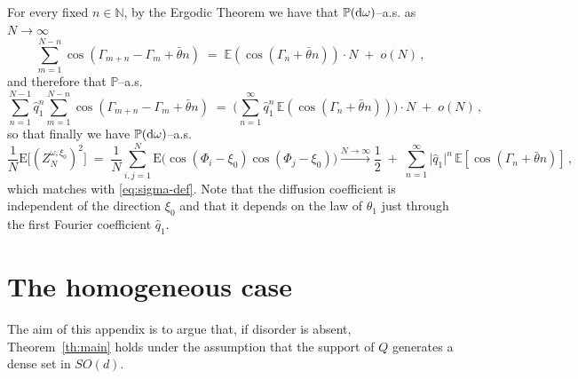 \documentclass[a4paper,reqno,11pt]{amsart}
\numberwithin{equation}{section}
\newcommand{\bbE}{{\ensuremath{\mathbb E}} }
\newcommand{\bbP}{{\ensuremath{\mathbb P}} }
\newcommand{\go}{\omega}
\newcommand{\dd}{\text{\rm d}}             %
\newcommand{\N}{\mathbb{N}}
\def\bE{\ensuremath{\bs{\mathrm{E}}}}
\def\bs{\boldsymbol}
\begin{document}
For every fixed $n\in\N$, by the Ergodic Theorem we have that $\bbP(\dd \go)$--a.s. as $N\to\infty$
\begin{equation}
    \sum_{m=1}^{N-n} \cos(\Gamma_{m+n} - \Gamma_m+\bar \theta n) \;=\; \bbE(\cos(\Gamma_n+\bar \theta n))
    \cdot N \;+\; o(N) \,,
\end{equation}
and therefore that $\bbP$--a.s.
\begin{equation}
    \sum_{n=1}^{N-1} \hat q_1^n \sum_{m=1}^{N-n} \cos(\Gamma_{m+n}
    - \Gamma_m + \bar \theta n) \;=\;
    \Bigg( \sum_{n=1}^\infty \hat q_1^n \,\bbE\left(\cos(\Gamma_n+\bar \theta n)\right) \Bigg) \cdot N \;+\; o(N)\,,
\end{equation}
so that finally we have $\bbP(\dd \go)$--a.s.
\begin{equation}
\label{eq:diffusion}
    \frac 1 N \bE\big[ (Z^{\go,\xi_0}_N)^2 \big]  \;=\;
    \frac{1}{N}\sum_{i,j = 1}^N \bE \big( \cos(\Phi_i-\xi_0)
    \cos(\Phi_j-\xi_0) \big) \stackrel{ N\to\infty }\longrightarrow
    \frac 12 \;+\; \sum_{n=1}^\infty \vert \hat q_1\vert^n \,\bbE[\cos(\Gamma_n +\bar \theta n)]\,,
\end{equation}
which matches with \eqref{eq:sigma-def}.
Note that the diffusion coefficient is independent of the direction
$\xi_0$ and that it depends on the law of
$\theta_1$ just through the first Fourier coefficient $\hat q_1$.


\medskip

\section{The homogeneous case}
\label{app:hom}

The aim of this appendix is to argue that, if disorder
is absent, Theorem~\ref{th:main} holds under the assumption
that the support of $Q$ generates a dense set in $SO(d)$.
\end{document}
